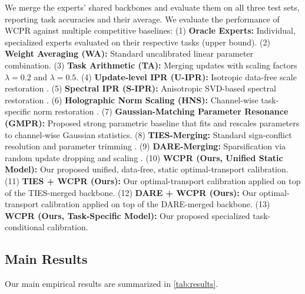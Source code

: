 \documentclass{article}
\theoremstyle{plain}
\theoremstyle{definition}
\theoremstyle{remark}
\begin{document}
We merge the experts' shared backbones and evaluate them on all three test sets, reporting task accuracies and their average. We evaluate the performance of WCPR against multiple competitive baselines:
(1) \textbf{Oracle Experts:} Individual, specialized experts evaluated on their respective tasks (upper bound).
(2) \textbf{Weight Averaging (WA):} Standard uncalibrated linear parameter combination.
(3) \textbf{Task Arithmetic (TA):} Merging updates with scaling factors $\lambda = 0.2$ and $\lambda = 0.5$.
(4) \textbf{Update-level IPR (U-IPR):} Isotropic data-free scale restoration \citep{leclaire2024isotropic}.
(5) \textbf{Spectral IPR (S-IPR):} Anisotropic SVD-based spectral restoration \citep{leclaire2024isotropic}.
(6) \textbf{Holographic Norm Scaling (HNS):} Channel-wise task-specific norm restoration \citep{visionary2026holographic}.
(7) \textbf{Gaussian-Matching Parameter Resonance (GMPR):} Proposed strong parametric baseline that fits and rescales parameters to channel-wise Gaussian statistics.
(8) \textbf{TIES-Merging:} Standard sign-conflict resolution and parameter trimming \citep{yadav2023ties}.
(9) \textbf{DARE-Merging:} Sparsification via random update dropping and scaling \citep{jin2023dataless}.
(10) \textbf{WCPR (Ours, Unified Static Model):} Our proposed unified, data-free, static optimal-transport calibration.
(11) \textbf{TIES + WCPR (Ours):} Our optimal-transport calibration applied on top of the TIES-merged backbone.
(12) \textbf{DARE + WCPR (Ours):} Our optimal-transport calibration applied on top of the DARE-merged backbone.
(13) \textbf{WCPR (Ours, Task-Specific Model):} Our proposed specialized task-conditional calibration.

\subsection{Main Results}

Our main empirical results are summarized in \cref{tab:results}.
\end{document}
